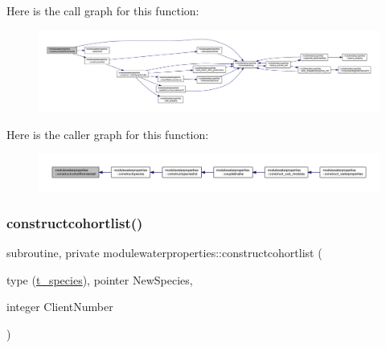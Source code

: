 Here is the call graph for this function\+:\nopagebreak
\begin{figure}[H]
\begin{center}
\leavevmode
\includegraphics[width=350pt]{namespacemodulewaterproperties_a1c0b4f7abb2ee1226f22838efe265c80_cgraph}
\end{center}
\end{figure}
Here is the caller graph for this function\+:\nopagebreak
\begin{figure}[H]
\begin{center}
\leavevmode
\includegraphics[width=350pt]{namespacemodulewaterproperties_a1c0b4f7abb2ee1226f22838efe265c80_icgraph}
\end{center}
\end{figure}
\mbox{\label{namespacemodulewaterproperties_abc72b5ed3f87133ad8c1dfd787c6eee5}} 
\subsubsection{\texorpdfstring{constructcohortlist()}{constructcohortlist()}}
{\footnotesize\ttfamily subroutine, private modulewaterproperties\+::constructcohortlist (\begin{DoxyParamCaption}\item[{type (\mbox{\hyperlink{structmodulewaterproperties_1_1t__species}{t\+\_\+species}}), pointer}]{New\+Species,  }\item[{integer}]{Client\+Number }\end{DoxyParamCaption})\hspace{0.3cm}{\ttfamily [private]}}

